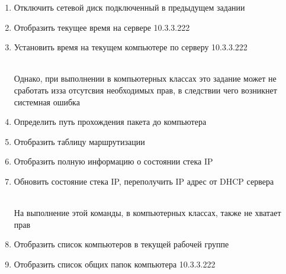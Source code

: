 \documentclass[a4paper,12pt]{article}
\begin{document}
\begin{flushleft}
\begin{enumerate} [1. ]
\begin{enumerate} [\bf a. ]
        \begin{flushleft}
        \end{flushleft}
        \item Отключить сетевой диск подключенный в предыдущем задании
        \begin{flushleft}
        \end{flushleft}
        \item Отобразить текущее время на сервере 10.3.3.222
        \begin{flushleft}
        \end{flushleft}
        \item Установить время на текущем компьютере по серверу 10.3.3.222
        \begin{flushleft}
          \\
         Однако, при выполнении в компьютерных классах это задание может не сработать изза отсутсвия необходимых прав, в следствии чего возникнет системная ошибка
        \end{flushleft}
        \item Определить путь прохождения пакета до компьютера 
        \begin{flushleft}
        \end{flushleft}
        \item Отобразить таблицу маршрутизации
        \begin{flushleft}
        \end{flushleft}
        \item Отобразить полную информацию о состоянии стека IP
        \begin{flushleft}
        \end{flushleft}
        \item Обновить состояние стека IP, переполучить IP адрес от DHCP сервера
        \begin{flushleft}
          \\
         На выполнение этой команды, в компьютерных классах, также не хватает прав
        \end{flushleft}
        \item Отобразить список компьютеров в текущей рабочей группе
        \begin{flushleft}
        \end{flushleft}
        \item Отобразить список общих папок компьютера 10.3.3.222
        \begin{flushleft}
          \\[1.5cm]
        \end{flushleft}


\end{enumerate}
\end{enumerate}
\end{flushleft}
\end{document}
